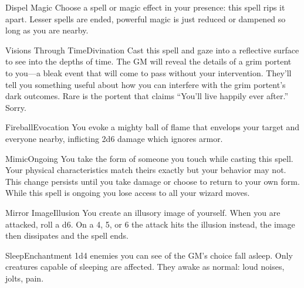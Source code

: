 \documentclass[8pt]{extarticle}
\begin{document}
\begin{multicols}{2}

  \begin{aspell}{Dispel Magic}{}
    Choose a spell or magic effect in your presence: this spell rips
    it apart. Lesser spells are ended, powerful magic is just reduced
    or dampened so long as you are nearby.
  \end{aspell}

  \begin{aspell}{Visions Through Time}{Divination}
    Cast this spell and gaze into a reflective surface to see into the
    depths of time. The GM will reveal the details of a grim portent
    to you—a bleak event that will come to pass without your
    intervention. They’ll tell you something useful about how you can
    interfere with the grim portent’s dark outcomes. Rare is the
    portent that claims “You’ll live happily ever after.” Sorry.
  \end{aspell}

  \begin{aspell}{Fireball}{Evocation}
    You evoke a mighty ball of flame that envelops your target and
    everyone nearby, inflicting 2d6 damage which ignores armor.
  \end{aspell}

  \vfill\null
  \columnbreak

  \begin{aspell}{Mimic}{Ongoing}
    You take the form of someone you touch while casting this
    spell. Your physical characteristics match theirs exactly but your
    behavior may not. This change persists until you take damage or
    choose to return to your own form. While this spell is ongoing you
    lose access to all your wizard moves.
  \end{aspell}

  \begin{aspell}{Mirror Image}{Illusion}
    You create an illusory image of yourself. When you are attacked,
    roll a d6. On a 4, 5, or 6 the attack hits the illusion instead,
    the image then dissipates and the spell ends.
  \end{aspell}

  \begin{aspell}{Sleep}{Enchantment}
    1d4 enemies you can see of the GM’s choice fall asleep. Only
    creatures capable of sleeping are affected. They awake as normal:
    loud noises, jolts, pain.
  \end{aspell}

\vfill\null
\end{multicols}
\end{document}
